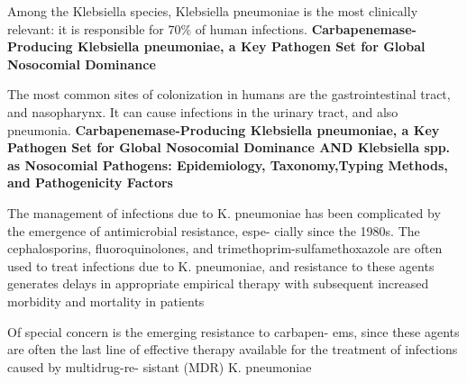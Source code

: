 \documentclass[11pt]{report}
\begin{document}
Among the Klebsiella species, Klebsiella pneumoniae is the most clinically relevant: it is responsible for 70$\%$ of human infections. \textbf{Carbapenemase-Producing Klebsiella pneumoniae, a Key Pathogen Set for Global Nosocomial Dominance}

The most common sites of colonization in humans are the gastrointestinal tract, and nasopharynx. It can cause infections in the urinary tract, and also pneumonia. \textbf{Carbapenemase-Producing Klebsiella pneumoniae, a Key Pathogen Set
for Global Nosocomial Dominance AND Klebsiella spp. as Nosocomial Pathogens: Epidemiology, Taxonomy,Typing Methods, and Pathogenicity Factors }













The management of infections due to K. pneumoniae has been
complicated by the emergence of antimicrobial resistance, espe-
cially since the 1980s. The cephalosporins, fluoroquinolones, and
trimethoprim-sulfamethoxazole are often used to treat infections
due to K. pneumoniae, and resistance to these agents generates
delays in appropriate empirical therapy with subsequent increased
morbidity and mortality in patients

Of special concern is the emerging resistance to carbapen-
ems, since these agents are often the last line of effective therapy
available for the treatment of infections caused by multidrug-re-
sistant (MDR) K. pneumoniae

















































\end{document}
